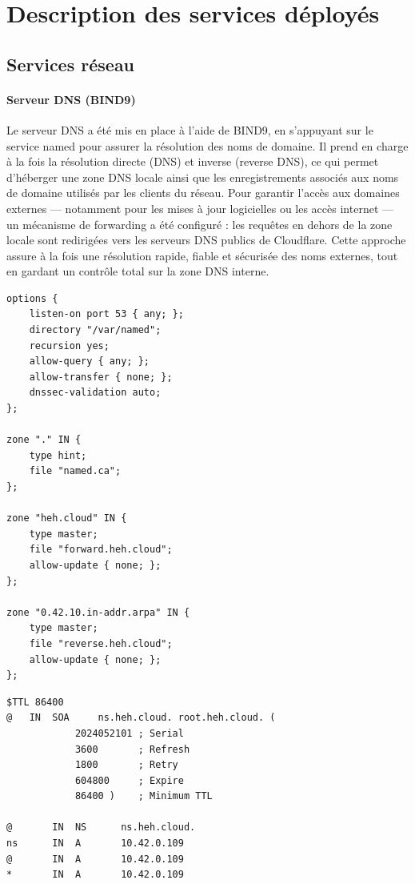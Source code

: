 \documentclass[a4paper,12pt]{article}
\begin{document}
\clearpage
\section{Description des services déployés}

\subsection{Services réseau}

\paragraph{Serveur DNS (BIND9)}

Le serveur DNS a été mis en place à l'aide de BIND9, en s'appuyant sur le service named pour assurer la résolution des noms de domaine. Il prend en charge à la fois la résolution directe (DNS) et inverse (reverse DNS), ce qui permet d'héberger une zone DNS locale ainsi que les enregistrements associés aux noms de domaine utilisés par les clients du réseau. Pour garantir l'accès aux domaines externes — notamment pour les mises à jour logicielles ou les accès internet — un mécanisme de forwarding a été configuré : les requêtes en dehors de la zone locale sont redirigées vers les serveurs DNS publics de Cloudflare. Cette approche assure à la fois une résolution rapide, fiable et sécurisée des noms externes, tout en gardant un contrôle total sur la zone DNS interne.

\begin{lstlisting}[caption={Configuration DNS BIND9 – /etc/named.conf}]
options {
    listen-on port 53 { any; };
    directory "/var/named";
    recursion yes;
    allow-query { any; };
    allow-transfer { none; };
    dnssec-validation auto;
};

zone "." IN {
    type hint;
    file "named.ca";
};

zone "heh.cloud" IN {
    type master;
    file "forward.heh.cloud";
    allow-update { none; };
};

zone "0.42.10.in-addr.arpa" IN {
    type master;
    file "reverse.heh.cloud";
    allow-update { none; };
};
\end{lstlisting}

\begin{lstlisting}[caption={Configuration DNS BIND9 – /var/named/forward.heh.cloud}]
$TTL 86400
@   IN  SOA     ns.heh.cloud. root.heh.cloud. (
            2024052101 ; Serial
            3600       ; Refresh
            1800       ; Retry
            604800     ; Expire
            86400 )    ; Minimum TTL

@       IN  NS      ns.heh.cloud.
ns      IN  A       10.42.0.109
@       IN  A       10.42.0.109
*       IN  A       10.42.0.109
\end{lstlisting}
\end{document}
